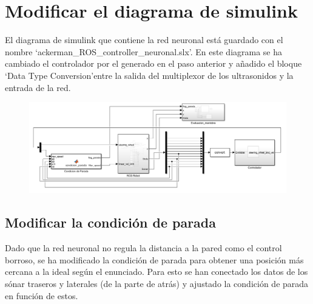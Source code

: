 \documentclass[a4paper, 12pt]{article}
\begin{document}
    \section{Modificar el diagrama de simulink}
	   
	El diagrama de simulink que contiene la red neuronal está guardado con el nombre \textquoteleft ackerman\_ROS\_controller\_neuronal.slx\textquoteright. En este diagrama se ha cambiado el controlador por el generado en el paso anterior y añadido el bloque \textquoteleft Data Type Conversion\textquoteright entre la salida del multiplexor de los ultrasonidos y la entrada de la red.

        \begin{figure}[htp!]
		\centering
		\includegraphics[width=1\textwidth]{figures/diagrama_simulink_neuronal.png}
	\end{figure}

        \subsection{Modificar la condición de parada}

            Dado que la red neuronal no regula la distancia a la pared como el control borroso, se ha modificado la condición de parada para obtener una posición más cercana a la ideal según el enunciado. Para esto se han conectado los datos de los sónar traseros y laterales (de la parte de atrás) y ajustado la condición de parada en función de estos.

            
 
\end{document}
